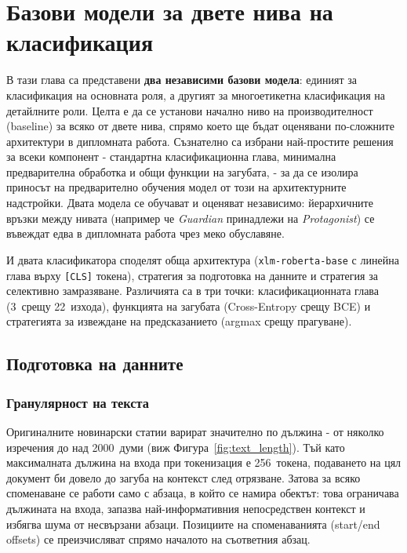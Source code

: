 \documentclass[12pt,a4paper]{report}
\begin{document}
\chapter{Базови модели за двете нива на класификация}

В тази глава са представени \textbf{два независими базови модела}: единият за класификация на основната роля, а другият за многоетикетна класификация на детайлните роли. Целта е да се установи начално ниво на производителност (baseline) за всяко от двете нива, спрямо което ще бъдат оценявани по-сложните архитектури в дипломната работа. Съзнателно са избрани най-простите решения за всеки компонент - стандартна класификационна глава, минимална предварителна обработка и общи функции на загубата, - за да се изолира приносът на предварително обучения модел от този на архитектурните надстройки. Двата модела се обучават и оценяват независимо: йерархичните връзки между нивата (например че \textit{Guardian} принадлежи на \textit{Protagonist}) се въвеждат едва в дипломната работа чрез меко обуславяне.

И двата класификатора споделят обща архитектура (\texttt{xlm-roberta-base} с линейна глава върху \texttt{[CLS]} токена), стратегия за подготовка на данните и стратегия за селективно замразяване. Различията са в три точки: класификационната глава (3~срещу 22~изхода), функцията на загубата (Cross-Entropy срещу BCE) и стратегията за извеждане на предсказанието (argmax срещу прагуване).


\section{Подготовка на данните}

\subsection{Гранулярност на текста}

Оригиналните новинарски статии варират значително по дължина - от няколко изречения до над 2000~думи (виж Фигура~\ref{fig:text_length}). Тъй като максималната дължина на входа при токенизация е 256~токена, подаването на цял документ би довело до загуба на контекст след отрязване. Затова за всяко споменаване се работи само с абзаца, в който се намира обектът: това ограничава дължината на входа, запазва най-информативния непосредствен контекст и избягва шума от несвързани абзаци. Позициите на споменаванията (start/end offsets) се преизчисляват спрямо началото на съответния абзац.
\end{document}
